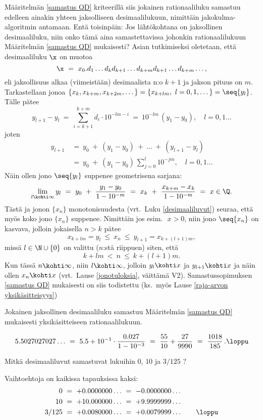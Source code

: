 Määritelmän \ref{samastus QD} kriteerillä siis jokainen rationaaliluku samastuu edelleen ainakin
yhteen jaksolliseen desimaalilukuun, nimittäin jakokulma-algoritmin antamaan. Entä toisinpäin: 
Jos lähtökohtana on jaksollinen desimaaliluku, niin onko tämä aina samastettavissa johonkin 
rationaalilukuun Määritelmän \ref{samastus QD} mukaisesti? Asian tutkimiseksi oletetaan, että
desimaaliluku $\x$ on muotoa
\[
\x\ =\ x_0. d_1 \ldots d_k d_{k+1} \ldots d_{k+m} d_{k+1} \ldots d_{k+m} \ldots,
\]
eli jaksollisuus alkaa (viimeistään) desimaalista n:o $k+1$ ja jakson pituus on $m$.
Tarkastellaan jonoa
$\{x_k, x_{k+m}, x_{k+2m}, \ldots\,\} = \{x_{k+lm},\ l=0,1,\ldots\,\} = \seq{y_l}$. Tälle pätee
\[
y_{l+1}-y_l\ =\ \sum_{i=k+1}^{k+m} d_i \cdot 10^{-lm-i}\ 
                         =\ 10^{-lm}\,(y_1 - y_0), \quad l = 0,1 \ldots
\]
joten
\begin{align*}
y_{l+1}\ &=\ y_0\ +\ (y_1-y_0)\ +\ \ldots\ +\ (y_{l+1}-y_l) \\
         &=\ y_0\ +\ (y_1 -y_0)\,\sum_{j=0}^l 10^{-jm}, \quad l = 0,1 \ldots
\end{align*}
Näin ollen jono $\seq{y_l}$ suppenee geometrisena sarjana:
\[
\lim_{l \kohti \infty} y_l\ =\ y_0\ +\ \frac{y_1-y_0}{1 - 10^{-m}}\
                            =\ x_k\ +\ \frac{x_{k+m} - x_k}{1 - 10^{-m}}\ =\ x \in \Q.
\]
Tästä ja jonon $\{x_n\}$ monotonisuudesta (vrt.\ Luku \ref{desimaaliluvut}) seuraa, että myös
koko jono $\{x_n\}$ suppenee. Nimittäin jos esim.\ $\,x > 0$, niin jono $\seq{x_n}$ on kasvava,
jolloin jokaisella $n>k$ pätee
\[
x_{k+lm}=y_l\ \le\ x_n\ \le\ y_{l+1}=x_{k+(l+1)m},
\]
missä $l\in\N\cup\{0\}$ on valittu ($n$:stä riippuen) siten, että
\[
k + lm\ <\ n\ \le\ k + (l+1)m.
\]
Kun tässä $n\kohti\infty$, niin $l\kohti\infty$, jolloin $y_l \kohti x$ ja $y_{l+1} \kohti x$
ja näin ollen $x_n \kohti x$ (vrt.\ Lause \ref{jonotuloksia}, väittämä V2).
Samastussopimuksen \ref{samastus QD} mukaisesti on siis todistettu (ks.\ myös Lause 
\ref{raja-arvon yksikäsitteisyys})
\begin{Lause} \label{samastuslause QD} Jokainen jaksollinen desimaaliluku samastuu
Määritelmän \ref{samastus QD} mukaisesti yksikäsitteiseen rationaalilukuun. 
\end{Lause}
\begin{Exa}
\[
5.5027027027\ldots\ =\ 5.5 + 10^{-1}\cdot\frac{0.027}{1-10^{-3}}\ 
                    =\ \frac{55}{10}+\frac{27}{9990}\ =\ \frac{1018}{185}\,. \loppu
\]
\end{Exa}
\begin{Exa} \label{samastuksia} Mitkä desimaaliluvut samastuvat lukuihin $0$, $10$ ja $ 3/125$ ? 
\end{Exa}
\ratk Vaihtoehtoja on kaikissa tapauksissa kaksi:
\begin{align*}
0\     &=\ +0.0000000 \ldots\ =\ -0.0000000 \ldots \\
10\    &=\ +10.000000 \ldots\ =\ +9.9999999 \ldots \\
3/125\ &=\ +0.0080000 \ldots\ =\ +0.0079999 \ldots \qquad \loppu
\end{align*}

